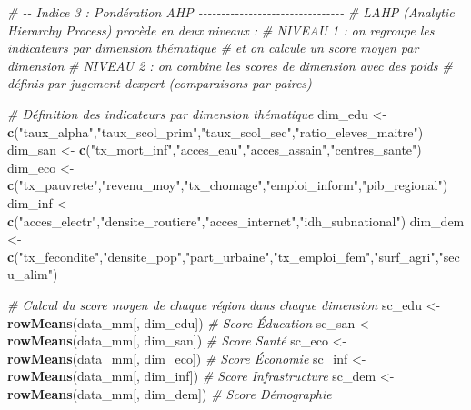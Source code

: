 \documentclass[
]{article}
\newenvironment{Shaded}{\begin{snugshade}}{\end{snugshade}}
\newcommand{\CommentTok}[1]{\textcolor[rgb]{0.56,0.35,0.01}{\textit{#1}}}
\newcommand{\FunctionTok}[1]{\textcolor[rgb]{0.13,0.29,0.53}{\textbf{#1}}}
\newcommand{\NormalTok}[1]{#1}
\newcommand{\OtherTok}[1]{\textcolor[rgb]{0.56,0.35,0.01}{#1}}
\newcommand{\StringTok}[1]{\textcolor[rgb]{0.31,0.60,0.02}{#1}}
\begin{document}
\begin{Shaded}
\begin{Highlighting}[]
\CommentTok{\# {-}{-} Indice 3 : Pondération AHP {-}{-}{-}{-}{-}{-}{-}{-}{-}{-}{-}{-}{-}{-}{-}{-}{-}{-}{-}{-}{-}{-}{-}{-}{-}{-}{-}{-}{-}{-}{-}{-}}
\CommentTok{\# L\textquotesingle{}AHP (Analytic Hierarchy Process) procède en deux niveaux :}
\CommentTok{\# NIVEAU 1 : on regroupe les indicateurs par dimension thématique}
\CommentTok{\#            et on calcule un score moyen par dimension}
\CommentTok{\# NIVEAU 2 : on combine les scores de dimension avec des poids}
\CommentTok{\#            définis par jugement d\textquotesingle{}expert (comparaisons par paires)}

\CommentTok{\# Définition des indicateurs par dimension thématique}
\NormalTok{dim\_edu }\OtherTok{\textless{}{-}} \FunctionTok{c}\NormalTok{(}\StringTok{"taux\_alpha"}\NormalTok{,}\StringTok{"taux\_scol\_prim"}\NormalTok{,}\StringTok{"taux\_scol\_sec"}\NormalTok{,}\StringTok{"ratio\_eleves\_maitre"}\NormalTok{)}
\NormalTok{dim\_san }\OtherTok{\textless{}{-}} \FunctionTok{c}\NormalTok{(}\StringTok{"tx\_mort\_inf"}\NormalTok{,}\StringTok{"acces\_eau"}\NormalTok{,}\StringTok{"acces\_assain"}\NormalTok{,}\StringTok{"centres\_sante"}\NormalTok{)}
\NormalTok{dim\_eco }\OtherTok{\textless{}{-}} \FunctionTok{c}\NormalTok{(}\StringTok{"tx\_pauvrete"}\NormalTok{,}\StringTok{"revenu\_moy"}\NormalTok{,}\StringTok{"tx\_chomage"}\NormalTok{,}\StringTok{"emploi\_inform"}\NormalTok{,}\StringTok{"pib\_regional"}\NormalTok{)}
\NormalTok{dim\_inf }\OtherTok{\textless{}{-}} \FunctionTok{c}\NormalTok{(}\StringTok{"acces\_electr"}\NormalTok{,}\StringTok{"densite\_routiere"}\NormalTok{,}\StringTok{"acces\_internet"}\NormalTok{,}\StringTok{"idh\_subnational"}\NormalTok{)}
\NormalTok{dim\_dem }\OtherTok{\textless{}{-}} \FunctionTok{c}\NormalTok{(}\StringTok{"tx\_fecondite"}\NormalTok{,}\StringTok{"densite\_pop"}\NormalTok{,}\StringTok{"part\_urbaine"}\NormalTok{,}\StringTok{"tx\_emploi\_fem"}\NormalTok{,}\StringTok{"surf\_agri"}\NormalTok{,}\StringTok{"secu\_alim"}\NormalTok{)}

\CommentTok{\# Calcul du score moyen de chaque région dans chaque dimension}
\NormalTok{sc\_edu }\OtherTok{\textless{}{-}} \FunctionTok{rowMeans}\NormalTok{(data\_mm[, dim\_edu])  }\CommentTok{\# Score Éducation}
\NormalTok{sc\_san }\OtherTok{\textless{}{-}} \FunctionTok{rowMeans}\NormalTok{(data\_mm[, dim\_san])  }\CommentTok{\# Score Santé}
\NormalTok{sc\_eco }\OtherTok{\textless{}{-}} \FunctionTok{rowMeans}\NormalTok{(data\_mm[, dim\_eco])  }\CommentTok{\# Score Économie}
\NormalTok{sc\_inf }\OtherTok{\textless{}{-}} \FunctionTok{rowMeans}\NormalTok{(data\_mm[, dim\_inf])  }\CommentTok{\# Score Infrastructure}
\NormalTok{sc\_dem }\OtherTok{\textless{}{-}} \FunctionTok{rowMeans}\NormalTok{(data\_mm[, dim\_dem])  }\CommentTok{\# Score Démographie}


\end{Highlighting}
\end{Shaded}
\end{document}
